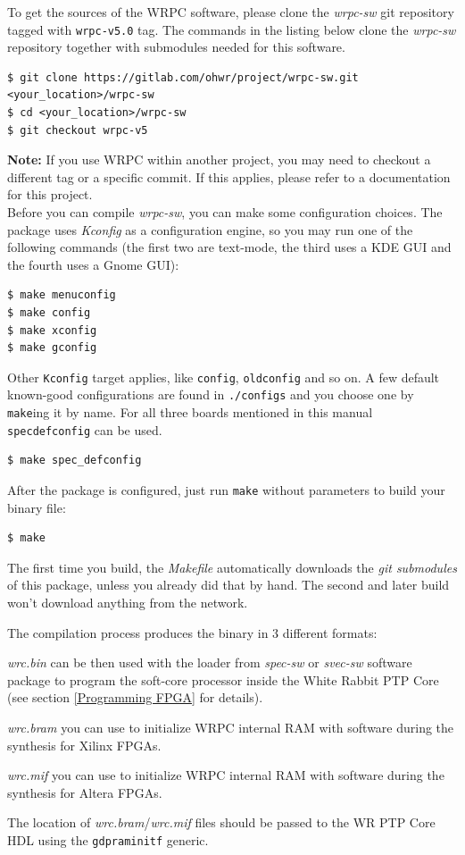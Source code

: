 \documentclass[a4paper, 12pt]{article}
\renewcommand{\_}{\underscore\allowbreak}
\newcommand{\code}[1]{\texttt{#1}}
\begin{document}
To get the sources of the WRPC software, please clone the \textit{wrpc-sw} git
repository tagged with \texttt{wrpc-v5.0} tag. The commands in the listing below
clone the \textit{wrpc-sw} repository together with submodules needed for this software.\\
\begin{lstlisting}
$ git clone https://gitlab.com/ohwr/project/wrpc-sw.git <your_location>/wrpc-sw
$ cd <your_location>/wrpc-sw
$ git checkout wrpc-v5
\end{lstlisting}

\textbf{Note:} If you use WRPC within another project, you may need to checkout
a different tag or a specific commit. If this applies, please refer to a
documentation for this project.\\

Before you can compile \textit{wrpc-sw}, you can make some configuration
choices. The package uses \textit{Kconfig} as a configuration engine, so you may
run one of the following commands (the first two are text-mode, the third uses
a KDE GUI and the fourth uses a Gnome GUI):
\begin{lstlisting}
$ make menuconfig
$ make config
$ make xconfig
$ make gconfig
\end{lstlisting}

Other \code{Kconfig} target applies, like \code{config}, \code{oldconfig}
and so on. A few default known-good configurations are found in
\texttt{./configs} and you choose one by \code{make}ing it by name. For all
three boards mentioned in this manual \code{spec\_defconfig} can be used.
\begin{lstlisting}
$ make spec_defconfig
\end{lstlisting}

After the package is configured, just run \code{make} without parameters to
build your binary file:
\begin{lstlisting}
$ make
\end{lstlisting}

The first time you build, the \textit{Makefile} automatically downloads
the \textit{git submodules} of this package, unless you already did that
by hand. The second and later build won't download anything
from the network.

The compilation process produces the binary in 3 different formats:
\begin{itemize*}
  \item \textit{wrc.bin} can be then used with the loader from \textit{spec-sw}
    or \textit{svec-sw} software package to program the soft-core processor
    inside the White
    Rabbit PTP Core (see section \ref{Programming FPGA} for details).
  \item \textit{wrc.bram} you can use to initialize WRPC internal RAM with
    software during the synthesis for Xilinx FPGAs.
  \item \textit{wrc.mif} you can use to initialize WRPC internal RAM with
    software during the synthesis for Altera FPGAs.
\end{itemize*}
The location of \textit{wrc.bram}/\textit{wrc.mif} files should be passed to the
WR PTP Core HDL using the \texttt{g\_dpram\_initf} generic.
\end{document}
